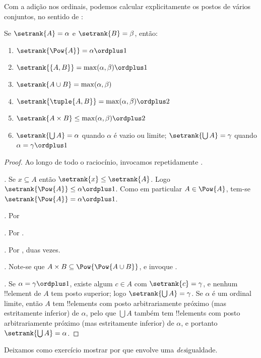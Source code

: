 \documentclass[../../../include/open-logic-section]{subfiles}
\begin{document}

Com a adição nos ordinais, podemos calcular explicitamente os postos
de vários conjuntos, no sentido de :

\begin{lem}
Se $\setrank{A} = \alpha$ e $\setrank{B} = \beta$, então:
\begin{enumerate}
	\item{} $\setrank{\Pow{A}} = \alpha\ordplus 1$
	\item{} $\setrank{\{A, B\}} = \max(\alpha,
	\beta) \ordplus 1$
	\item{} $\setrank{A \cup B} = \max(\alpha,
	\beta)$
	\item{} $\setrank{\tuple{A,B}} = \max(\alpha,
	\beta) \ordplus  2$
	\item{} $\setrank{A \times B} \leq \max(\alpha,
	\beta) \ordplus  2$
	\item{} $\setrank{\bigcup A} = \alpha$ quando
	$\alpha$ é vazio ou limite; $\setrank{\bigcup A} = \gamma$ quando
	$\alpha = \gamma\ordplus 1$
\end{enumerate}
\end{lem}

\begin{proof}
Ao longo de todo o raciocínio, invocamos repetidamente .

\emph{.} Se $x \subseteq A$ então $\setrank{x} \leq
\setrank{A}$. Logo $\setrank{\Pow{A}} \leq \alpha \ordplus  1$. Como em particular $A
\in \Pow{A}$, tem-se $\setrank{\Pow{A}} = \alpha \ordplus  1$.

\emph{.} Por 

\emph{.} Por .

\emph{.} Por , duas vezes.

\emph{.} Note-se que $A \times B \subseteq
\Pow{\Pow{A \cup B}}$, e invoque .

\emph{.} Se $\alpha = \gamma\ordplus 1$, existe
algum $c \in A$ com $\setrank{c} = \gamma$, e nenhum !!{element} de $A$
tem posto superior; logo $\setrank{\bigcup A} = \gamma$. Se $\alpha$ é um
ordinal limite, então $A$ tem !!{element}s com posto arbitrariamente próximo
(mas estritamente inferior) de $\alpha$, pelo que $\bigcup A$ também tem
!!{element}s com posto arbitrariamente próximo (mas estritamente inferior) de
$\alpha$, e portanto $\setrank{\bigcup A} = \alpha$.
\end{proof}
\noindent
Deixamos como exercício mostrar por que  envolve uma
\emph{des}igualdade.
\end{document}
